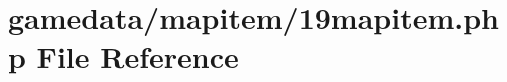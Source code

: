 \hypertarget{19mapitem_8php}{\section{gamedata/mapitem/19mapitem.php File Reference}
\label{19mapitem_8php}
}

